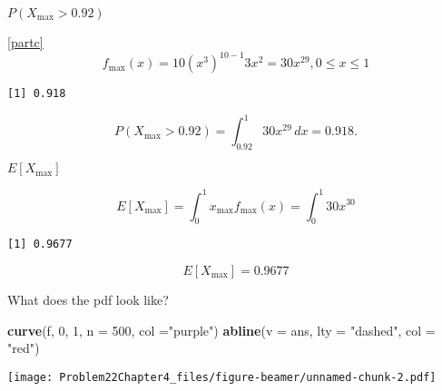 \documentclass[ignorenonframetext,]{beamer}
\makeatletter
\newenvironment{Shaded}{\begin{snugshade}}{\end{snugshade}}
\newcommand{\KeywordTok}[1]{\textcolor[rgb]{0.13,0.29,0.53}{\textbf{{#1}}}}
\newcommand{\DataTypeTok}[1]{\textcolor[rgb]{0.13,0.29,0.53}{{#1}}}
\newcommand{\DecValTok}[1]{\textcolor[rgb]{0.00,0.00,0.81}{{#1}}}
\newcommand{\FloatTok}[1]{\textcolor[rgb]{0.00,0.00,0.81}{{#1}}}
\newcommand{\StringTok}[1]{\textcolor[rgb]{0.31,0.60,0.02}{{#1}}}
\newcommand{\NormalTok}[1]{{#1}}
\def\ScaleIfNeeded{%
  \ifdim\Gin@nat@width>\linewidth
    \linewidth
  \else
    \Gin@nat@width
  \fi
}
\let\Oldincludegraphics\includegraphics
\renewcommand{\includegraphics}[2][]{\Oldincludegraphics[width=\ScaleIfNeeded]{#2}}
\makeatother
\begin{document}
\begin{frame}[fragile]{$P(X_{\textrm{max}} > 0.92)$}

\eqref{partc}
\[f_{\textrm{max}}(x) = 10\left(x^3\right)^{10-1}3x^2 = 30x^{29},  0\leq x \leq 1\]

\begin{Shaded}
\end{Shaded}

\begin{verbatim}
[1] 0.918
\end{verbatim}

\[P(X_{\textrm{max}} > 0.92) = \int_{0.92}^{1}30x^{29}\,dx = 0.918.\]

\end{frame}

\begin{frame}[fragile]{$E[X_{\textrm{max}}]$}

\[E[X_{\textrm{max}}] = \int_{0}^{1}x_{\textrm{max}} f_{\textrm{max}}(x) = \int_{0}^{1}30x^{30}\]

\begin{Shaded}
\end{Shaded}

\begin{verbatim}
[1] 0.9677
\end{verbatim}

\[E[X_{\textrm{max}}] = 0.9677\]

\end{frame}

\begin{frame}[fragile]{What does the pdf look like?}

\begin{Shaded}
\begin{Highlighting}[]
\KeywordTok{curve}\NormalTok{(f, }\DecValTok{0}\NormalTok{, }\DecValTok{1}\NormalTok{, }\DataTypeTok{n =} \DecValTok{500}\NormalTok{, }\DataTypeTok{col =}\StringTok{"purple"}\NormalTok{)}
\KeywordTok{abline}\NormalTok{(}\DataTypeTok{v =} \NormalTok{ans, }\DataTypeTok{lty =} \StringTok{"dashed"}\NormalTok{, }\DataTypeTok{col =} \StringTok{"red"}\NormalTok{)}
\end{Highlighting}
\end{Shaded}

\texttt{[image: Problem22Chapter4\_files/figure-beamer/unnamed-chunk-2.pdf]}

\end{frame}
\end{document}
